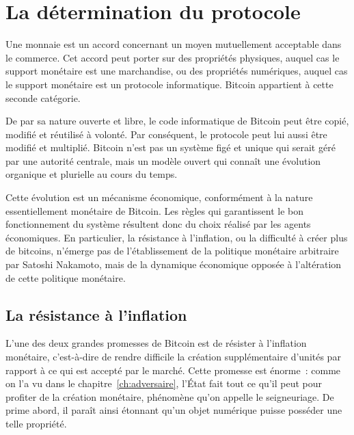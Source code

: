 
\chapter{La détermination du protocole}
\label{ch:determination}

Une monnaie est un accord concernant un moyen mutuellement acceptable dans le commerce. Cet accord peut porter sur des propriétés physiques, auquel cas le support monétaire est une marchandise, ou des propriétés numériques, auquel cas le support monétaire est un protocole informatique. Bitcoin appartient à cette seconde catégorie.

De par sa nature ouverte et libre, le code informatique de Bitcoin peut être copié, modifié et réutilisé à volonté. Par conséquent, le protocole peut lui aussi être modifié et multiplié. Bitcoin n'est pas un système figé et unique qui serait géré par une autorité centrale, mais un modèle ouvert qui connaît une évolution organique et plurielle au cours du temps.

Cette évolution est un mécanisme économique, conformément à la nature essentiellement monétaire de Bitcoin. Les règles qui garantissent le bon fonctionnement du système résultent donc du choix réalisé par les agents économiques. En particulier, la résistance à l'inflation, ou la difficulté à créer plus de bitcoins, n'émerge pas de l'établissement de la politique monétaire arbitraire par Satoshi Nakamoto, mais de la dynamique économique opposée à l'altération de cette politique monétaire.

\section*{La résistance à l'inflation}

L'une des deux grandes promesses de Bitcoin est de résister à l'inflation monétaire, c'est-à-dire de rendre difficile la création supplémentaire d'unités par rapport à ce qui est accepté par le marché. Cette promesse est énorme~: comme on l'a vu dans le chapitre~\ref{ch:adversaire}, l'État fait tout ce qu'il peut pour profiter de la création monétaire, phénomène qu'on appelle le seigneuriage. De prime abord, il paraît ainsi étonnant qu'un objet numérique puisse posséder une telle propriété.

